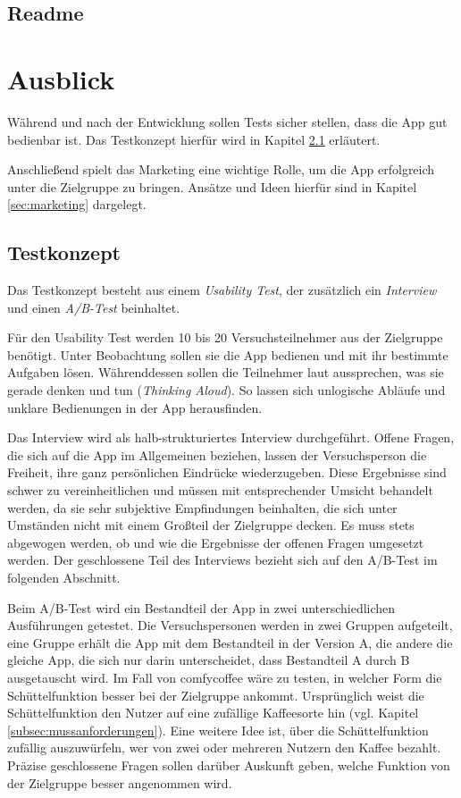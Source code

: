 \section{Readme}






\chapter{Ausblick}
\label{ausblick}
Während und nach der Entwicklung sollen Tests sicher stellen, dass die App gut bedienbar ist. Das Testkonzept hierfür wird in Kapitel \ref{sec:testkonzept} erläutert.

Anschließend spielt das Marketing eine wichtige Rolle, um die App erfolgreich unter die Zielgruppe zu bringen. Ansätze und Ideen hierfür sind in Kapitel \ref{sec:marketing} dargelegt.

\section{Testkonzept}
\label{sec:testkonzept}
Das Testkonzept besteht aus einem \emph{Usability Test}, der zusätzlich ein \emph{Interview} und einen \emph{A/B-Test} beinhaltet.

Für den Usability Test werden 10 bis 20  Versuchsteilnehmer aus der Zielgruppe benötigt. Unter Beobachtung sollen sie die App bedienen und mit ihr bestimmte Aufgaben lösen. Währenddessen sollen die Teilnehmer laut aussprechen, was sie gerade denken und tun (\emph{Thinking Aloud}). So lassen sich unlogische Abläufe und unklare Bedienungen in der App herausfinden.

Das Interview wird als halb-strukturiertes Interview durchgeführt. Offene Fragen, die sich auf die App im Allgemeinen beziehen, lassen der Versuchsperson die Freiheit, ihre ganz persönlichen Eindrücke wiederzugeben. Diese Ergebnisse sind schwer zu vereinheitlichen und müssen mit entsprechender Umsicht behandelt werden, da sie sehr subjektive Empfindungen beinhalten, die sich unter Umständen nicht mit einem Großteil der Zielgruppe decken. Es muss stets abgewogen werden, ob und wie die Ergebnisse der offenen Fragen umgesetzt werden. Der geschlossene Teil des Interviews bezieht sich auf den A/B-Test im folgenden Abschnitt.

Beim A/B-Test wird ein Bestandteil der App in zwei unterschiedlichen Ausführungen getestet. Die Versuchspersonen werden in zwei Gruppen aufgeteilt, eine Gruppe erhält die App mit dem Bestandteil in der Version A, die andere die gleiche App, die sich nur darin unterscheidet, dass Bestandteil A durch B ausgetauscht wird. Im Fall von comfycoffee wäre zu testen, in welcher Form die Schüttelfunktion besser bei der Zielgruppe ankommt. Ursprünglich weist die Schüttelfunktion den Nutzer auf eine zufällige Kaffeesorte hin (vgl. Kapitel \ref{subsec:mussanforderungen}). Eine weitere Idee ist, über die Schüttelfunktion zufällig auszuwürfeln, wer von zwei oder mehreren Nutzern den Kaffee bezahlt. Präzise geschlossene Fragen sollen darüber Auskunft geben, welche Funktion von der Zielgruppe besser angenommen wird.

